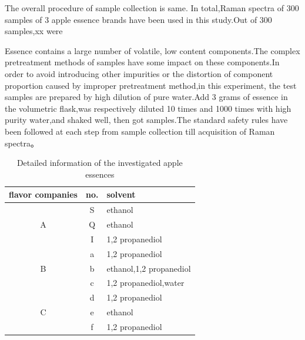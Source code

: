 \documentclass[a4paper]{article}
\begin{document}
The overall procedure of sample collection is same. In total,Raman spectra of 300 samples of 3 apple essence brands have been used in this study.Out of 300 samples,xx were

Essence contains a large number of volatile, low content components.The complex pretreatment methods of samples have some impact on these components.In order to avoid introducing other impurities or the distortion of component proportion caused by improper pretreatment method,in this experiment, the test samples are prepared by high dilution of pure water.Add 3 grams of essence in the volumetric flask,was respectively diluted 10 times and 1000 times with high purity water,and  shaked well, then got samples.The  standard  safety  rules  have  been  followed  at  each step from sample collection till acquisition of Raman spectra。


\begin{table}[h] %
  \centering
  \caption{Detailed information of the investigated apple essences}\label{a}
  \begin{tabular}{c|c|l}

     \hline
     flavor companies       & no.       & solvent \\
     \hline
     \multirow{3}{*}{A}       & S         & ethanol \\
     \cline{2-3}
                              & Q         & ethanol \\
     \cline{2-3}
                              & I         & 1,2 propanediol \\
     \hline
     \multirow{3}{*}{B}       & a         & 1,2 propanediol \\
     \cline{2-3}
                              & b         & ethanol,1,2 propanediol \\
     \cline{2-3}
                              & c         & 1,2 propanediol,water \\
     \hline
     \multirow{3}{*}{C}       & d         & 1,2 propanediol \\
     \cline{2-3}
                              & e         & ethanol \\
     \cline{2-3}
                              & f         & 1,2 propanediol \\
     \hline
   \end{tabular}

\end{table}
\end{document}
